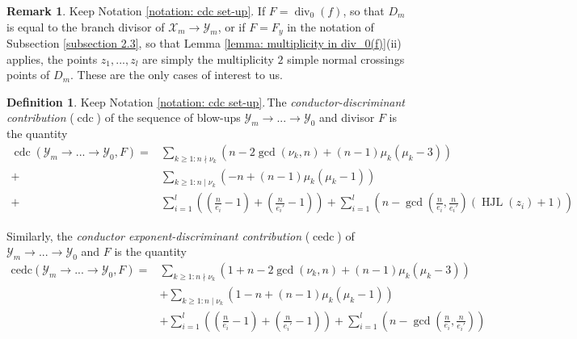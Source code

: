 \documentclass[12pt]{amsart}
\numberwithin{equation}{section}
\theoremstyle{definition}
\newtheorem{remark}[equation]{Remark}
\newtheorem{defn}[equation]{Definition}
\newcommand{\X}{\mathcal{X}}
\newcommand{\Y}{\mathcal{Y}}
\newcommand{\tx}[1]{\text{#1}}
\DeclareMathOperator{\divi}{div}
\DeclareMathOperator{\cdc}{cdc}
\DeclareMathOperator{\cedc}{cedc}
\DeclareMathOperator{\HJL}{HJL}
\begin{document}
\begin{remark}\label{rmk: mult 2 pt discrepancy}
    Keep Notation \ref{notation: cdc set-up}. If $F=\divi_0(f)$, so that $D_m$ is equal to the branch divisor of $\X_m\to\Y_m$, or if $F=F_y$ in the notation of Subsection \ref{subsection 2.3}, so that Lemma \ref{lemma: multiplicity in div_0(f)}(ii) applies, the points $z_1,...,z_l$ are simply the multiplicity $2$ simple normal crossings points of $D_m$. These are the only cases of interest to us.
\end{remark}

\begin{defn}\label{dfn: cdc of sequence}
    \cite[Definition 9.4]{Part1}
    Keep Notation \ref{notation: cdc set-up}.\,The \textit{conductor-discriminant contribution} ($\cdc$) of the sequence of blow-ups $\Y_m\to...\to\Y_0$ and divisor $F$ is the quantity
    \begin{align*}
        \cdc(\Y_m\to...\to\Y_0,F)=&\sum_{k\geq 1:n\nmid\nu_k}(n-2\gcd(\nu_k,n)+(n-1)\mu_k(\mu_k-3))\\
        +&\sum_{k\geq 1:n\mid\nu_k}(-n+(n-1)\mu_k(\mu_k-1))\\+&\sum_{i=1}^l((\frac{n}{e_i}-1)+(\frac{n}{e_i'}-1))+\sum_{i=1}^l(n-\gcd(\frac{n}{e_i},\frac{n}{e_i'})(\HJL(z_i)+1))
    \end{align*}
    
    Similarly, the \textit{conductor exponent-discriminant contribution} ($\cedc$) of $\Y_m\to...\to\Y_0$ and $F$ is the quantity
    \begin{align*}
        \tx{cedc}(\Y_m\to...\to\Y_0,F)=&\sum_{k\geq1:n\nmid\nu_k}(1+n-2\gcd(\nu_k,n)+(n-1)\mu_k(\mu_k-3))\\
        &+\sum_{k\geq 1:n\mid\nu_k}(1-n+(n-1)\mu_k(\mu_k-1))
        \\&+\sum_{i=1}^l((\frac{n}{e_i}-1)+(\frac{n}{e_i'}-1))+\sum_{i=1}^l(n-\gcd(\frac{n}{e_i},\frac{n}{e_i'}))
    \end{align*}


\end{defn}
\end{document}
